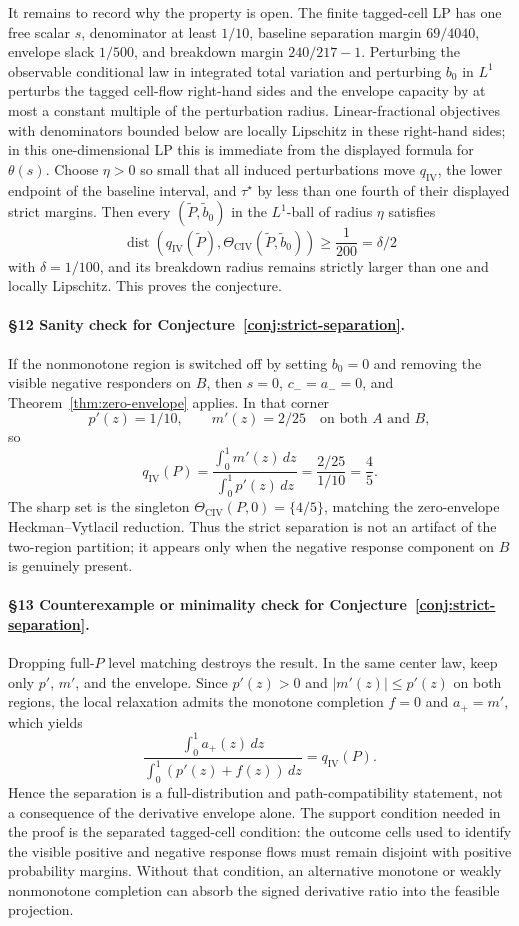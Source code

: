 It remains to record why the property is open.  The finite tagged-cell LP has
one free scalar \(s\), denominator at least \(1/10\), baseline separation
margin \(69/4040\), envelope slack \(1/500\), and breakdown margin
\(240/217-1\).  Perturbing the observable conditional law in integrated total
variation and perturbing \(b_0\) in \(L^1\) perturbs the tagged cell-flow
right-hand sides and the envelope capacity by at most a constant multiple of
the perturbation radius.  Linear-fractional objectives with denominators
bounded below are locally Lipschitz in these right-hand sides; in this
one-dimensional LP this is immediate from the displayed formula for
\(\theta(s)\).  Choose \(\eta>0\) so small that all induced perturbations move
\(q_{\mathrm{IV}}\), the lower endpoint of the baseline interval, and
\(\tau^\star\) by less than one fourth of their displayed strict margins.
Then every \((\widetilde P,\widetilde b_0)\) in the \(L^1\)-ball of radius
\(\eta\) satisfies
\[
\operatorname{dist}\!\left(q_{\mathrm{IV}}(\widetilde P),
\Theta_{\mathrm{CIV}}(\widetilde P,\widetilde b_0)\right)
\ge\frac1{200}
=\delta/2
\]
with \(\delta=1/100\), and its breakdown radius remains strictly larger than
one and locally Lipschitz.  This proves the conjecture.

\paragraph{\S12 Sanity check for Conjecture~\ref{conj:strict-separation}.}
If the nonmonotone region is switched off by setting \(b_0=0\) and removing
the visible negative responders on \(B\), then \(s=0\), \(c_-=a_-=0\), and
Theorem~\ref{thm:zero-envelope} applies.  In that corner
\[
p'(z)=1/10,\qquad m'(z)=2/25\quad\text{on both }A\text{ and }B,
\]
so
\[
q_{\mathrm{IV}}(P)=
\frac{\int_0^1m'(z)\,dz}{\int_0^1p'(z)\,dz}
=
\frac{2/25}{1/10}
=\frac45.
\]
The sharp set is the singleton \(\Theta_{\mathrm{CIV}}(P,0)=\{4/5\}\), matching
the zero-envelope Heckman--Vytlacil reduction.  Thus the strict separation is
not an artifact of the two-region partition; it appears only when the negative
response component on \(B\) is genuinely present.

\paragraph{\S13 Counterexample or minimality check for Conjecture~\ref{conj:strict-separation}.}
Dropping full-\(P\) level matching destroys the result.  In the same center
law, keep only \(p'\), \(m'\), and the envelope.  Since \(p'(z)>0\) and
\(|m'(z)|\le p'(z)\) on both regions, the local relaxation admits the monotone
completion \(f=0\) and \(a_+=m'\), which yields
\[
\frac{\int_0^1a_+(z)\,dz}{\int_0^1(p'(z)+f(z))\,dz}
=
q_{\mathrm{IV}}(P).
\]
Hence the separation is a full-distribution and path-compatibility statement,
not a consequence of the derivative envelope alone.  The support condition
needed in the proof is the separated tagged-cell condition: the outcome cells
used to identify the visible positive and negative response flows must remain
disjoint with positive probability margins.  Without that condition, an
alternative monotone or weakly nonmonotone completion can absorb the signed
derivative ratio into the feasible projection.
